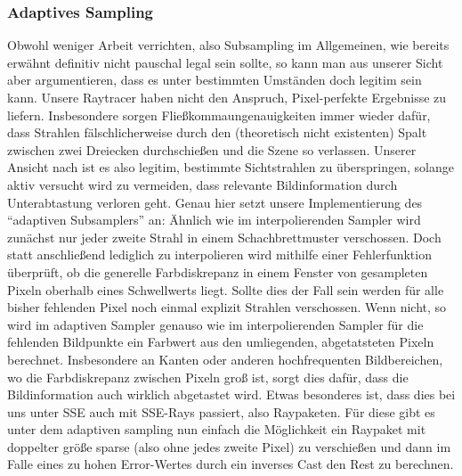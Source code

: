 \subsubsection{Adaptives Sampling}
\label{ssec:adaptive-sampling}
Obwohl weniger Arbeit verrichten, also Subsampling im Allgemeinen, wie bereits erwähnt definitiv nicht pauschal legal sein sollte, so kann man aus unserer Sicht aber argumentieren, dass es unter bestimmten Umständen doch legitim sein kann.
Unsere Raytracer haben nicht den Anspruch, Pixel-perfekte Ergebnisse zu liefern.
Insbesondere sorgen Fließkommaungenauigkeiten immer wieder dafür, dass Strahlen fälschlicherweise durch den (theoretisch nicht existenten) Spalt zwischen zwei Dreiecken durchschießen und die Szene so verlassen.
Unserer Ansicht nach ist es also legitim, bestimmte Sichtstrahlen zu überspringen, solange aktiv versucht wird zu vermeiden, dass relevante Bildinformation durch Unterabtastung verloren geht.
Genau hier setzt unsere Implementierung des "`adaptiven Subsamplers"' an:
Ähnlich wie im interpolierenden Sampler wird zunächst nur jeder zweite Strahl in einem Schachbrettmuster verschossen.
Doch statt anschließend lediglich zu interpolieren wird mithilfe einer Fehlerfunktion überprüft, ob die generelle Farbdiskrepanz in einem Fenster von gesampleten Pixeln oberhalb eines Schwellwerts liegt.
Sollte dies der Fall sein werden für alle bisher fehlenden Pixel noch einmal explizit Strahlen verschossen.
Wenn nicht, so wird im adaptiven Sampler genauso wie im interpolierenden Sampler für die fehlenden Bildpunkte ein Farbwert aus den umliegenden, abgetatsteten Pixeln berechnet.
Insbesondere an Kanten oder anderen hochfrequenten Bildbereichen, wo die Farbdiskrepanz zwischen Pixeln groß ist, sorgt dies dafür, dass die Bildinformation auch wirklich abgetastet wird.
Etwas besonderes ist, dass dies bei uns unter SSE auch mit SSE-Rays passiert, also Raypaketen.
Für diese gibt es unter dem adaptiven sampling nun einfach die Möglichkeit ein Raypaket mit doppelter größe sparse (also ohne jedes zweite Pixel) zu verschießen und dann im Falle eines zu hohen Error-Wertes durch ein inverses Cast den Rest zu berechnen.
